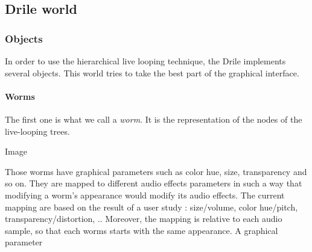 \subsection{Drile world} 
 \subsubsection{Objects}
 In order to use the hierarchical live looping technique, the Drile implements several objects. This world tries to take the best part of the graphical interface.
\paragraph{Worms}    
 The first one is what we call a \textit{worm}. It is the representation of the nodes of the live-looping trees.
 
  Image
  
Those worms have graphical parameters such as color hue, size, transparency and so on. They are mapped to different audio effects parameters in such a way that modifying a worm's appearance would modify its audio effects. The current mapping are based on the result of a user study : size/volume, color hue/pitch, transparency/distortion, .. Moreover, the mapping is relative to each audio sample, so that each worms starts with the same appearance. A graphical parameter 
  
